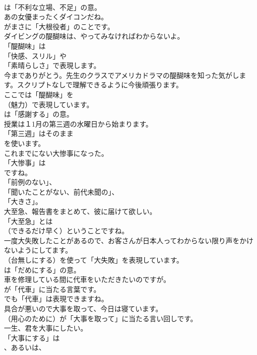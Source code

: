 \documentclass[8pt]{extreport}
\begin{document}
\begin{CJK}{UTF8}{min}
\\	は「不利な立場、不足」の意。	
\\	あの女優まったくダイコンだね。 
\\	がまさに「大根役者」のことです。	
\\	ダイビングの醍醐味は、やってみなければわからないよ。 
\\	「醍醐味」は
\\	「快感、スリル」や
\\	「素晴らしさ」で表現します。	
\\	今までありがとう。先生のクラスでアメリカドラマの醍醐味を知った気がします。スクリプトなしで理解できるように今後頑張ります。 
\\	ここでは「醍醐味」を 
\\	（魅力）で表現しています。
\\	は「感謝する」の意。	
\\	授業は１1月の第三週の水曜日から始まります。 
\\	「第三週」はそのまま
\\	を使います。	
\\	これまでにない大惨事になった。 
\\	「大惨事」は
\\	ですね。
\\	「前例のない」、
\\	「聞いたことがない、前代未聞の」、
\\	「大きさ」。	
\\	大至急、報告書をまとめて、彼に届けて欲しい。 
\\	「大至急」とは
\\	（できるだけ早く）ということですね。	
\\	一度大失敗したことがあるので、お客さんが日本人ってわからない限り声をかけないようにしてます。 
\\	（台無しにする）を使って「大失敗」を表現しています。
\\	は「だめにする」の意。	
\\	車を修理している間に代車をいただきたいのですが。 
\\	が「代車」に当たる言葉です。
\\	でも「代車」は表現できますね。	
\\	具合が悪いので大事を取って、今日は寝ています。 
\\	（用心のために）が「大事を取って」に当たる言い回しです。	
\\	一生、君を大事にしたい。 
\\	「大事にする」は
\\	、あるいは、

\end{CJK}
\end{document}
